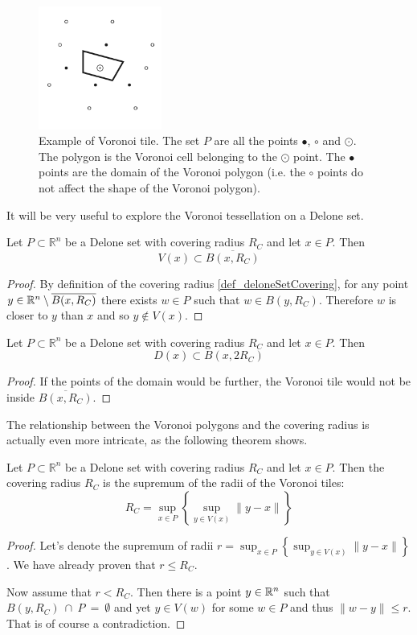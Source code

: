 \documentclass[text.tex]{subfiles}
\begin{document}
\begin{figure}[h]
\centering
\includegraphics[width=0.36\textwidth]{img/preliminaries/voronoi}
\caption{Example of Voronoi tile. The set $P$ are all the points $\bullet$, $\circ$ and $\odot$. The polygon is the Voronoi cell belonging to the $\odot$ point. The $\bullet$ points are the domain of the Voronoi polygon (i.e. the $\circ$ points do not affect the shape of the Voronoi polygon).}
\label{fig_voronoiExample}
\end{figure}

It will be very useful to explore the Voronoi tessellation on a Delone set. 

\begin{theorem}
Let $P\subset \mathbb{R}^n$ be a Delone set with covering radius $R_C$ and let $x\in P$. Then 
$$V(x)\subset \overline{B(x,R_C)}$$
\end{theorem}
\begin{proof}
By definition of the covering radius \ref{def_deloneSetCovering}, for any point $y\in \mathbb{R}^n\setminus \overline{B(x,R_C)}$ there exists $w\in P$ such that $w\in B(y,R_C)$. Therefore $w$ is closer to $y$ than $x$ and so $y\not\in V(x)$.
\end{proof}

\begin{theorem}\label{the_voronoiDomainLimit}
Let $P\subset \mathbb{R}^n$ be a Delone set with covering radius $R_C$ and let $x\in P$. Then 
$$D(x)\subset B(x,2R_C)$$
\end{theorem}
\begin{proof}
If the points of the domain would be further, the Voronoi tile would not be inside $\overline{B(x,R_C)}$. 
\end{proof}

The relationship between the Voronoi polygons and the covering radius is actually even more intricate, as the following theorem shows. 

\begin{theorem}
Let $P\subset \mathbb{R}^n$ be a Delone set with covering radius $R_C$ and let $x\in P$. Then the covering radius $R_C$ is the supremum of the radii of the Voronoi tiles:  
$$R_C = \sup_{x\in P}\left\{\sup_{y\in V(x)}\lVert y-x\rVert\right\}$$
\end{theorem}
\begin{proof}
Let's denote the supremum of radii $r= \sup_{x\in P}\left\{\sup_{y\in V(x)}\lVert y-x\rVert\right\}$. We have already proven that $r\leq R_C$.

Now assume that $r<R_C$. Then there is a point $y\in\mathbb{R}^n$ such that $B(y,R_C)~\cap~P~=~\emptyset$ and yet $y\in V(w)$ for some $w\in P$ and thus $\lVert w -y \rVert\leq r$. That is of course a contradiction. 
\end{proof}
\end{document}
